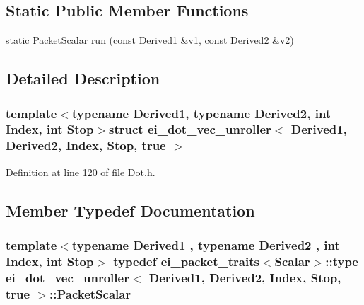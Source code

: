 \subsection*{Static Public Member Functions}
\begin{DoxyCompactItemize}
\item 
static \hyperlink{structei__dot__vec__unroller_3_01_derived1_00_01_derived2_00_01_index_00_01_stop_00_01true_01_4_a2d76052ba25bd60e5fee8f20edc9ab92}{Packet\-Scalar} \hyperlink{structei__dot__vec__unroller_3_01_derived1_00_01_derived2_00_01_index_00_01_stop_00_01true_01_4_a8763c8a1d7ad0f8b2dd0958592829dd4}{run} (const Derived1 \&\hyperlink{glext_8h_aabdd9aabede45fcf97cea04f88d2ad60}{v1}, const Derived2 \&\hyperlink{glext_8h_ae35401c8c2fcdcc48c20ba325ee473ea}{v2})
\end{DoxyCompactItemize}


\subsection{Detailed Description}
\subsubsection*{template$<$typename Derived1, typename Derived2, int Index, int Stop$>$struct ei\-\_\-dot\-\_\-vec\-\_\-unroller$<$ Derived1, Derived2, Index, Stop, true $>$}



Definition at line 120 of file Dot.\-h.



\subsection{Member Typedef Documentation}
\hypertarget{structei__dot__vec__unroller_3_01_derived1_00_01_derived2_00_01_index_00_01_stop_00_01true_01_4_a2d76052ba25bd60e5fee8f20edc9ab92}{
\subsubsection[{Packet\-Scalar}]{\setlength{\rightskip}{0pt plus 5cm}template$<$typename Derived1 , typename Derived2 , int Index, int Stop$>$ typedef {\bf ei\-\_\-packet\-\_\-traits}$<${\bf Scalar}$>$\-::{\bf type} {\bf ei\-\_\-dot\-\_\-vec\-\_\-unroller}$<$ Derived1, Derived2, Index, Stop, true $>$\-::{\bf Packet\-Scalar}}}\label{structei__dot__vec__unroller_3_01_derived1_00_01_derived2_00_01_index_00_01_stop_00_01true_01_4_a2d76052ba25bd60e5fee8f20edc9ab92}


